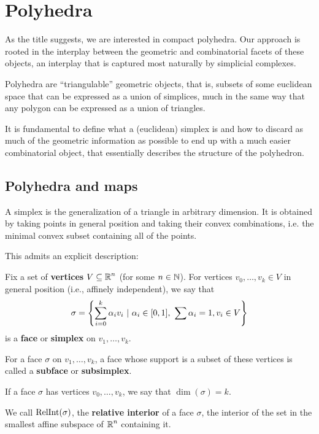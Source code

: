 \section{Polyhedra}
As the title suggests, we are interested in compact polyhedra. Our approach is rooted in the interplay between the geometric and combinatorial facets of these objects,
an interplay that is captured most naturally by simplicial complexes.

Polyhedra are ``triangulable'' geometric objects, that is, subsets of some euclidean space that can be expressed 
as a union of simplices, much in the same way that any polygon can be expressed as a union of triangles.

It is fundamental to define what a (euclidean) simplex is and how to discard as much of the geometric information as possible 
to end up with a much easier combinatorial object, that essentially describes the structure of the 
polyhedron.
\subsection{Polyhedra and maps}
A simplex is the generalization of a triangle in arbitrary dimension. It is obtained by 
taking points in general position and taking their convex combinations, i.e. 
the minimal convex subset containing all of the points. 

This admits an explicit description:
\begin{definition}[Simplex]
    Fix a set of \textbf{vertices} $V\subseteq\operatorname{\mathbb{R}}^n$ (for some $n\in \operatorname{\mathbb{N}}$). For vertices $v_0,\dots,v_k\in V$ in general position (i.e., affinely independent), we say that
    \[\sigma=\set{\sum_{i=0}^k \alpha_i v_i\ |\ \alpha_i\in[0,1],\ \sum\alpha_i=1, v_i\in V}\]
    is a \textbf{face} or \textbf{simplex} on $v_1,\dots,v_k$.

    For a face $\sigma$ on $v_1,\dots,v_k$, a face whose support is a subset of these vertices is called a \textbf{subface} or \textbf{subsimplex}.

    If a face $\sigma$ has vertices $v_0,\dots,v_k$, we say that $\dim(\sigma)=k$.

    We call $\operatorname{RelInt}(\sigma)$, the \textbf{relative interior} of a face $\sigma$, the interior of the set in the smallest affine subspace of $\operatorname{\mathbb{R}}^n$ containing it.
\end{definition}

